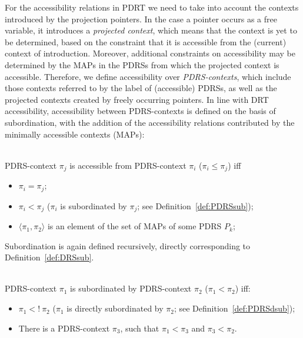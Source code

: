 For the accessibility relations in PDRT we need to take into account the
contexts introduced by the projection pointers. In the case a pointer occurs
as a free variable, it introduces a \textit{projected context}, which means
that the context is yet to be determined, based on the constraint that it is
accessible from the (current) context of introduction.  Moreover, additional
constraints on accessibility may be determined by the MAPs in the PDRSs from
which the projected context is accessible.
Therefore, we define accessibility over \textit{PDRS-contexts}, which
include those contexts referred to by the label of (accessible) PDRSs, as
well as the projected contexts created by freely occurring pointers.  In
line with DRT accessibility, accessibility between PDRS-contexts is defined
on the basis of subordination, with the addition of the accessibility
relations contributed by the minimally accessible contexts (MAPs):

\begin{definition}~\\
PDRS-context $\pi_j$ is accessible from PDRS-context $\pi_i$ 
($\pi_i \leq \pi_j$) iff
  \begin{itemize}
    \item $\pi_i = \pi_j$;
    \item $\pi_i < \pi_j$ ($\pi_i$ is subordinated by $\pi_j$; see
      Definition~\ref{def:PDRSsub});
    \item $\langle \pi_1,\pi_2 \rangle$ is an element of the set of
     MAPs of some PDRS $P_k$;
  \end{itemize}
\end{definition}

\noindent Subordination is again defined recursively, directly corresponding
to Definition~\ref{def:DRSsub}.

\begin{subdefinition}\label{def:PDRSsub}~\\
PDRS-context $\pi_1$ is subordinated by PDRS-context $\pi_2$
($\pi_1 < \pi_2$) iff:
\begin{itemize}
   \item $\pi_1 <!~\pi_2$ ($\pi_1$ is directly subordinated by $\pi_2$; 
     see Definition~\ref{def:PDRSdsub});
   \item There is a PDRS-context $\pi_3$, such that $\pi_1 < \pi_3$ and
     $\pi_3 < \pi_2$.
\end{itemize}
\end{subdefinition}

